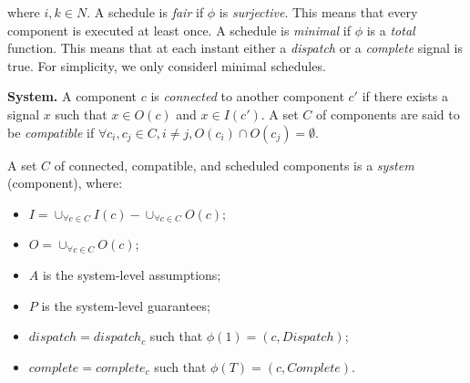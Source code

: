 where $i,k\in N$. 
A schedule is \emph{fair} if $\phi$ is \emph{surjective}. This means that every component is executed at least once.
A schedule is \emph{minimal} if $\phi$ is a \emph{total} function. This means that at each instant either a \emph{dispatch} or a \emph{complete} signal is true. 
For simplicity, we only considerl minimal schedules.

{\bf System.}
A component $c$ is \emph{connected} to another component $c'$ if there exists a signal $x$ such that $x \in O(c)$ and $x \in I(c')$. 
A set $C$ of components are said to be \emph{compatible} if 
$\forall c_i,c_j \in C, i\neq j, O(c_i) \cap O(c_j) = \emptyset$.

A set $C$ of connected, compatible, and scheduled components is a \emph{system} (component), where:
\begin{itemize}
	\item $I = \cup_{\forall c \in C}I(c) -  \cup_{\forall c \in C}O(c)$;
	\item $O = \cup_{\forall c \in C}O(c)$;
	\item $A$ is the system-level assumptions;
	\item $P$ is the system-level guarantees;
	\item $dispatch = dispatch_c$ such that $\phi(1) = (c, Dispatch)$;
	\item $complete = complete_c$ such that $\phi(T) = (c, Complete)$.
\end{itemize}

